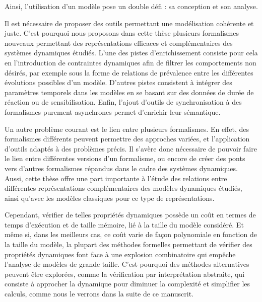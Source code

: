 Ainsi, l'utilisation d'un modèle pose un double défi : sa conception et son analyse.

Il est nécessaire de proposer des outils permettant une modélisation cohérente et juste.
C'est pourquoi nous proposons dans cette thèse plusieurs formalismes nouveaux permettant
des représentations efficaces et complémentaires des systèmes dynamiques étudiés.
L'une des pistes d'enrichissement consiste pour cela
en l'introduction de contraintes dynamiques afin de filtrer les comportements non désirés,
par exemple sous la forme 
de relations de prévalence entre les différentes évolutions possibles d'un modèle.
D'autres pistes consistent à intégrer des paramètres temporels dans les modèles
en se basant sur des données de durée de réaction ou de sensibilisation.
Enfin, l'ajout d'outils de synchronisation à des formalismes purement asynchrones
permet d'enrichir leur sémantique.


Un autre problème courant est le lien entre plusieurs formalismes.
En effet, des formalismes différents peuvent permettre des approches variées,
et l'application d'outils adaptés à des problèmes précis.
Il s'avère donc nécessaire de pouvoir faire le lien entre différentes versions
d'un formalisme, ou encore de créer des ponts vers d'autres formalismes répandus
dans le cadre des systèmes dynamiques.
Aussi, cette thèse offre une part importante à l'étude des relations entre différentes
représentations complémentaires des modèles dynamiques étudiés,
ainsi qu'avec les modèles classiques pour ce type de représentations.

Cependant, vérifier de telles propriétés dynamiques possède un coût
en termes de temps d'exécution et de taille mémoire,
lié à la taille du modèle considéré.
Et même si, dans les meilleurs cas, ce coût varie de façon polynomiale
en fonction de la taille du modèle,
la plupart des méthodes formelles permettant de vérifier des propriétés dynamiques
font face à une explosion combinatoire qui empêche l'analyse de modèles de grande taille.
C'est pourquoi des méthodes alternatives peuvent être explorées,
comme la vérification par interprétation abstraite,
qui consiste à approcher la dynamique pour diminuer la complexité et simplifier les calculs,
comme nous le verrons dans la suite de ce manuscrit.

